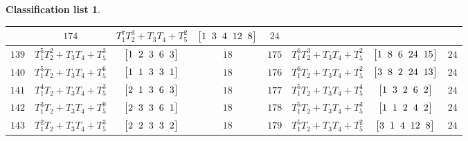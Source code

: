 \documentclass[10pt,a4paper]{amsart}
\theoremstyle{definition}
\newtheorem{class-list}[thm]{Classification list}
\numberwithin{equation}{section}
\begin{document}
\begin{class-list}
\begin{table}[t!]
\begin{tabu}{c|c|c|c||c|c|c|c}
&${174}$&${T_{1}^{7}T_{2}^{3}+T_{3}T_{4}+T_{5}^{2}}$
&$\arraycolsep=1mm\begin{bmatrix}{1} & {3} & {4} & {12} & {8}\end{bmatrix}$&${24}$
\\
\hline
${139}$&${T_{1}^{5}T_{2}^{2}+T_{3}T_{4}+T_{5}^{3}}$
&$\arraycolsep=1mm\begin{bmatrix}{1} & {2} & {3} & {6} & {3}\end{bmatrix}$&${18}$
&${175}$&${T_{1}^{6}T_{2}^{3}+T_{3}T_{4}+T_{5}^{2}}$
&$\arraycolsep=1mm\begin{bmatrix}{1} & {8} & {6} & {24} & {15}\end{bmatrix}$&${24}$
\\
\hline
${140}$&${T_{1}^{5}T_{2}+T_{3}T_{4}+T_{5}^{6}}$
&$\arraycolsep=1mm\begin{bmatrix}{1} & {1} & {3} & {3} & {1}\end{bmatrix}$&${18}$
&${176}$&${T_{1}^{6}T_{2}+T_{3}T_{4}+T_{5}^{2}}$
&$\arraycolsep=1mm\begin{bmatrix}{3} & {8} & {2} & {24} & {13}\end{bmatrix}$&${24}$
\\
\hline
${141}$&${T_{1}^{4}T_{2}+T_{3}T_{4}+T_{5}^{3}}$
&$\arraycolsep=1mm\begin{bmatrix}{2} & {1} & {3} & {6} & {3}\end{bmatrix}$&${18}$
&${177}$&${T_{1}^{5}T_{2}+T_{3}T_{4}+T_{5}^{4}}$
&$\arraycolsep=1mm\begin{bmatrix}{1} & {3} & {2} & {6} & {2}\end{bmatrix}$&${24}$
\\
\hline
${142}$&${T_{1}^{3}T_{2}+T_{3}T_{4}+T_{5}^{9}}$
&$\arraycolsep=1mm\begin{bmatrix}{2} & {3} & {3} & {6} & {1}\end{bmatrix}$&${18}$
&${178}$&${T_{1}^{5}T_{2}+T_{3}T_{4}+T_{5}^{3}}$
&$\arraycolsep=1mm\begin{bmatrix}{1} & {1} & {2} & {4} & {2}\end{bmatrix}$&${24}$
\\
\hline
${143}$&${T_{1}^{2}T_{2}+T_{3}T_{4}+T_{5}^{3}}$
&$\arraycolsep=1mm\begin{bmatrix}{2} & {2} & {3} & {3} & {2}\end{bmatrix}$&${18}$
&${179}$&${T_{1}^{5}T_{2}+T_{3}T_{4}+T_{5}^{2}}$
&$\arraycolsep=1mm\begin{bmatrix}{3} & {1} & {4} & {12} & {8}\end{bmatrix}$&${24}$
\\

\end{tabu}
\end{table}
\end{class-list}
\end{document}
